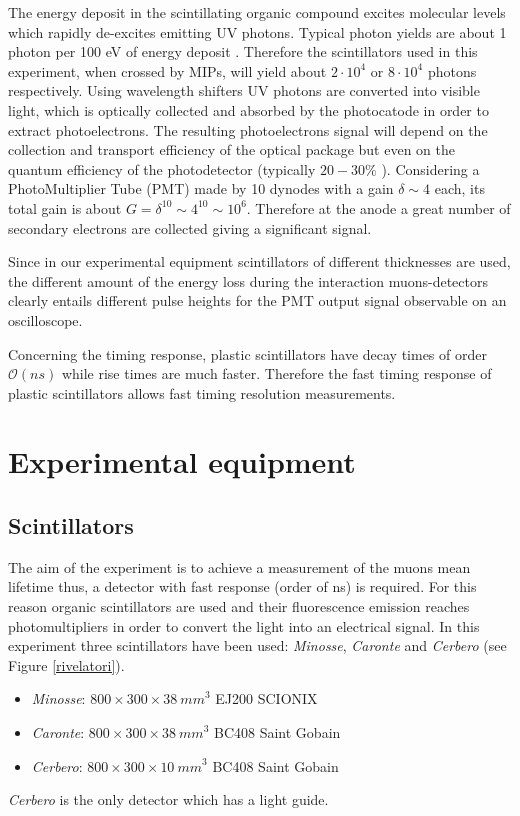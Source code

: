 The energy deposit in the scintillating organic compound excites molecular levels which rapidly de-excites emitting UV photons. Typical photon yields are about 1 photon per
100 eV of energy deposit \cite{PDG}. Therefore the scintillators used in this experiment, when crossed by MIPs, will yield about $2 \cdot 10^4$ or $8 \cdot 10^4$ photons respectively. Using wavelength shifters UV photons are converted into visible light, which is optically collected and absorbed by the photocatode in order to extract photoelectrons.
The resulting photoelectrons signal will
depend on the collection and transport efficiency of the optical package but even on the quantum
efficiency of the photodetector \cite{PDG} (typically $20-30\%$ \cite{Knoll}). Considering a PhotoMultiplier Tube (PMT) made by 10 dynodes with a gain $\delta \sim 4$ each, its total gain is about $ G = \delta^{10} \sim 4^{10} \sim 10^6$. Therefore at the anode a great number of secondary electrons are collected giving a significant signal.

Since in our experimental equipment scintillators of different thicknesses are used, the different amount of the energy loss during the interaction muons-detectors clearly entails different pulse heights for the PMT output signal observable on an oscilloscope.

Concerning the timing response, plastic scintillators have decay times of order $\mathcal{O}(\si{ns})$ while rise times are much faster.
Therefore the fast timing response of plastic scintillators allows fast timing resolution measurements.

\section{Experimental equipment} \label{expeq}
\subsection{Scintillators} \label{scintillators}

The aim of the experiment is to achieve a measurement of the muons mean lifetime thus, a detector with fast response (order of ns) is required. For this reason organic scintillators are used and their fluorescence emission reaches photomultipliers in order to convert the light into an electrical signal.
In this experiment three scintillators have been used: \emph{Minosse}, \emph{Caronte} and \emph{Cerbero} (see Figure \ref{rivelatori}).
\begin{itemize}
	\item \emph{Minosse}:  $800\times 300\times\SI{38}{mm}^3$ EJ200 SCIONIX
	\item \emph{Caronte}:  $800\times 300\times\SI{38}{mm}^3$ BC408 Saint Gobain
	\item \emph{Cerbero}:  $800\times 300\times\SI{10}{mm}^3$ BC408 Saint Gobain
\end{itemize}
\emph{Cerbero} is the only detector which has a light guide.

